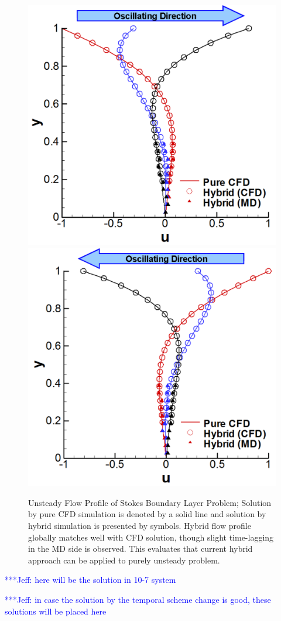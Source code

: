 \documentclass[preprint,12pt]{elsarticle}
\newcommand{\skonote}[1]{ {\textcolor{blue} { ***Jeff: #1 }}}
\newcommand{\skonote}[1]{}
\begin{document}
\begin{figure}
\centering
\includegraphics[width=0.6\linewidth]{Stokes_Sol_1_New.pdf}
\hskip 1cm
\includegraphics[width=0.6\linewidth]{Stokes_Sol_2_New.pdf}
\vskip-0.2cm
\caption{\small Unsteady Flow Profile of Stokes Boundary Layer Problem; Solution by pure CFD simulation is denoted by a solid line and solution by hybrid simulation is presented by symbols. Hybrid flow profile globally matches well with CFD solution, though slight time-lagging in the MD side is observed. This evaluates that current hybrid approach can be applied to purely unsteady problem.}
\label{Stokes_Sol}
\end{figure}

\skonote{here will be the solution in 10-7 system}
\newline
\newline
\newline

\skonote{in case the solution by the temporal scheme change is good, these solutions will be placed here}
\newline
\newline
\newline
\end{document}
